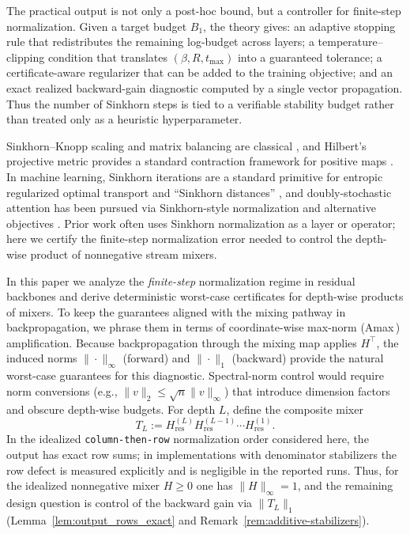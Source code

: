 \documentclass[11pt]{article}
\numberwithin{equation}{section}
\theoremstyle{plain}
\theoremstyle{definition}
\theoremstyle{remark}
\newcommand{\Hres}{H_{\mathrm{res}}}
\newcommand{\Amax}{\textsf{Amax}\,}
\begin{document}
\medskip
The practical output is not only a post-hoc bound, but a controller for finite-step normalization. Given a target budget $B_1$, the theory gives: an adaptive stopping rule that redistributes the remaining log-budget across layers; a temperature--clipping condition that translates $(\beta,R,t_{\max})$ into a guaranteed tolerance; a certificate-aware regularizer that can be added to the training objective; and an exact realized backward-gain diagnostic computed by a single vector propagation. Thus the number of Sinkhorn steps is tied to a verifiable stability budget rather than treated only as a heuristic hyperparameter.

\medskip
Sinkhorn--Knopp scaling and matrix balancing are classical \citep{SinkhornKnopp1967,FranklinLorenz1989,Knight2008}, and Hilbert’s projective metric provides a standard contraction framework for positive maps \citep{Birkhoff1957,Bushell1973}.
In machine learning, Sinkhorn iterations are a standard primitive for entropic regularized optimal transport and ``Sinkhorn distances'' \citep{Cuturi2013,PeyreCuturi2019}, and doubly-stochastic attention has been pursued via Sinkhorn-style normalization \citep{Sander2022Sinkformers} and alternative objectives \citep{Shahbazi2025ESPFormer}. 
Prior work often uses Sinkhorn normalization as a layer or operator; here we
certify the finite-step normalization error needed to control the depth-wise
product of nonnegative stream mixers.

In this paper we analyze the \emph{finite-step} normalization regime in residual backbones and derive deterministic worst-case certificates for depth-wise products of mixers. To keep the guarantees aligned with the mixing pathway in backpropagation, we phrase them in terms of coordinate-wise max-norm (\Amax) amplification.\label{subsec:intro_amax}
 Because backpropagation through the mixing map applies $H^\top$,
the induced norms $\|\cdot\|_\infty$ (forward) and $\|\cdot\|_1$ (backward) provide the natural worst-case guarantees for this diagnostic.
Spectral-norm control would require norm conversions (e.g., $\|v\|_2\le \sqrt{n}\|v\|_\infty$) that introduce dimension factors and obscure depth-wise budgets.
For depth $L$, define the composite mixer
\begin{equation}\label{eq:TLdef}
T_L := \Hres^{(L)}\Hres^{(L-1)}\cdots \Hres^{(1)}.
\end{equation}
In the idealized \texttt{column-then-row} normalization order considered here, the output has exact row sums; in implementations with denominator stabilizers the row defect is measured explicitly and is negligible in the reported runs. Thus, for the idealized nonnegative mixer $H\ge 0$ one has $\|H\|_\infty=1$, and the remaining design question is control of the backward gain via $\|T_L\|_1$ (Lemma~\ref{lem:output_rows_exact} and Remark~\ref{rem:additive-stabilizers}).
\end{document}
